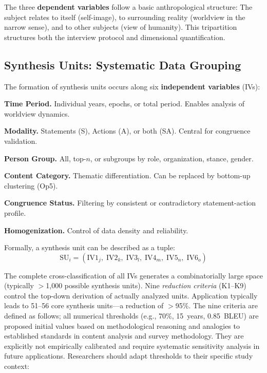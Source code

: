 \documentclass[11pt,a4paper]{article}
\theoremstyle{definition}
\theoremstyle{plain}
\theoremstyle{remark}
\begin{document}
The three \textbf{dependent variables} follow a basic anthropological structure: The subject relates to itself (self-image), to surrounding reality (worldview in the narrow sense), and to other subjects (view of humanity). This tripartition structures both the interview protocol and dimensional quantification.


\subsection{Synthesis Units: Systematic Data Grouping}

The formation of synthesis units occurs along six \textbf{independent variables} (IVs):

\begin{description}[leftmargin=*,labelwidth=1.5cm]
  \item[IV1] \textbf{Time Period.} Individual years, epochs, or total period. Enables analysis of worldview dynamics.
  \item[IV2] \textbf{Modality.} Statements (S), Actions (A), or both (SA). Central for congruence validation.
  \item[IV3] \textbf{Person Group.} All, top-$n$, or subgroups by role, organization, stance, gender.
  \item[IV4] \textbf{Content Category.} Thematic differentiation. Can be replaced by bottom-up clustering (Op5).
  \item[IV5] \textbf{Congruence Status.} Filtering by consistent or contradictory statement-action profile.
  \item[IV6] \textbf{Homogenization.} Control of data density and reliability.
\end{description}

Formally, a synthesis unit can be described as a tuple:
\begin{equation}
  \text{SU}_i = (\text{IV1}_j,\; \text{IV2}_k,\; \text{IV3}_l,\; \text{IV4}_m,\; \text{IV5}_n,\; \text{IV6}_o)
\end{equation}

The complete cross-classification of all IVs generates a combinatorially large space (typically $>$1,000 possible synthesis units). Nine \emph{reduction criteria} (K1--K9) control the top-down derivation of actually analyzed units. Application typically leads to 51--56 core synthesis units---a reduction of $>$95\%. The nine criteria are defined as follows; all numerical thresholds (e.g., 70\%, 15~years, 0.85~BLEU) are proposed initial values based on methodological reasoning and analogies to established standards in content analysis and survey methodology. They are explicitly not empirically calibrated and require systematic sensitivity analysis in future applications. Researchers should adapt thresholds to their specific study context:
\end{document}
